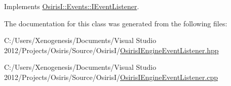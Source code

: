 Implements \hyperlink{class_osiris_i_1_1_events_1_1_i_event_listener_a230481634f96c92c7010fabf917d566c}{Osiris\-I\-::\-Events\-::\-I\-Event\-Listener}.



The documentation for this class was generated from the following files\-:\begin{DoxyCompactItemize}
\item 
C\-:/\-Users/\-Xenogenesis/\-Documents/\-Visual Studio 2012/\-Projects/\-Osiris/\-Source/\-Osiris\-I/\hyperlink{_osiris_i_engine_event_listener_8hpp}{Osiris\-I\-Engine\-Event\-Listener.\-hpp}\item 
C\-:/\-Users/\-Xenogenesis/\-Documents/\-Visual Studio 2012/\-Projects/\-Osiris/\-Source/\-Osiris\-I/\hyperlink{_osiris_i_engine_event_listener_8cpp}{Osiris\-I\-Engine\-Event\-Listener.\-cpp}\end{DoxyCompactItemize}
